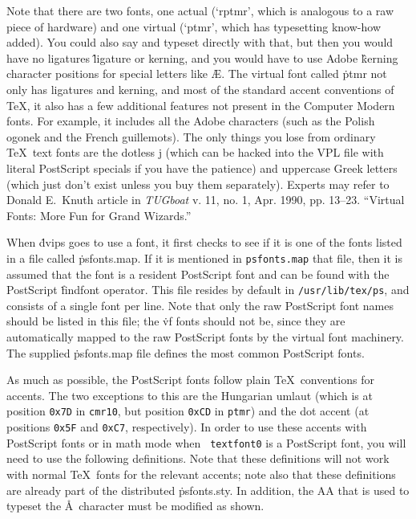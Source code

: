 Note that there are two fonts, one actual (`rptmr',
which is analogous to a raw piece of hardware) and one virtual
(`ptmr', which has typesetting know-how added). You could also say
\noindent
and typeset directly with that, but then you would have no ligatures
\^{ligature}
or kerning, and you would have to use Adobe
\^{kerning}
character positions for special letters like \AE. The virtual font
called \.{ptmr} not only has ligatures and kerning, and most of the
standard accent conventions of \TeX, it also has a few additional
features not present in the Computer Modern fonts. For example, it
includes all the Adobe characters (such as the Polish ogonek and the
French guillemots).  The only things you lose from ordinary \TeX\ text
fonts are the dotless j (which can be hacked into the VPL file with
literal PostScript specials if you have the patience) and uppercase
Greek letters (which just don't exist unless you buy them separately).
Experts may refer to Donald E.~Knuth article in {\it TUGboat} v. 11,
no. 1, Apr. 1990, pp. 13--23.  ``Virtual Fonts: More Fun for Grand
Wizards.''

When \.{dvips} goes to use a font, it first checks to see if it is one of
the fonts listed in a file called \.{psfonts.map}.  If it is mentioned in
\^{{\tt psfonts.map}}
that file, then it is assumed that the font is a resident PostScript font
and can be found with the PostScript \.{findfont} operator.  This file
resides by default in {\tt /usr/lib/tex/ps}, and consists of a single font
per line.  Note that only the raw PostScript font names should be listed
in this file; the \.{vf} fonts should not be, since they are automatically
mapped to the raw PostScript fonts by the virtual font machinery.
The supplied \.{psfonts.map} file defines the most common PostScript fonts.

As much as possible, the PostScript fonts follow plain \TeX\ conventions
for accents.  The two exceptions to this are the Hungarian umlaut (which
is at position {\tt 0x7D} in {\tt cmr10}, but position {\tt 0xCD} in
{\tt ptmr}) and the dot accent (at positions {\tt 0x5F} and {\tt 0xC7},
respectively).	In order to use these accents with PostScript fonts or in
math mode when {\tt {} textfont0} is a PostScript font, you will need
to use the following definitions.  Note that these definitions will not work
with normal \TeX\ fonts for the relevant accents; note also that these
definitions are already part of the distributed \.{psfonts.sty}.
In addition, the \.{ AA} that is used to typeset the \AA\ character
must be modified as shown.

